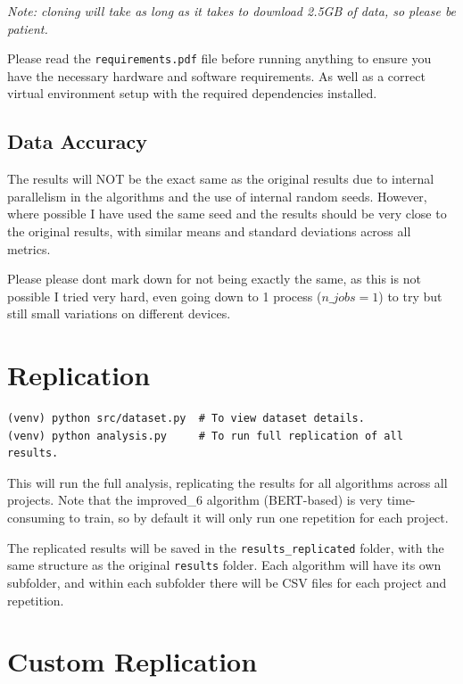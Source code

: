 \documentclass{article}
\begin{document}
\textit{Note: cloning will take as long as it takes to download 2.5GB of data, so please be patient.}

Please read the \texttt{requirements.pdf} file before running anything to ensure you have the necessary hardware and software requirements. As well as a correct virtual environment setup with the required dependencies installed.

\subsection*{Data Accuracy}
The results will NOT be the exact same as the original results due to internal parallelism in the algorithms and the use of internal random seeds.
However, where possible I have used the same seed and the results should be very close to the original results, with similar means and standard deviations across all metrics.

Please please dont mark down for not being exactly the same, as this is not possible I tried very hard,
even going down to 1 process ($n\_jobs=1$) to try but still small variations on different devices.

\vspace{10px}

\section*{Replication}

\begin{verbatim}
(venv) python src/dataset.py  # To view dataset details.
(venv) python analysis.py     # To run full replication of all results.
\end{verbatim}

This will run the full analysis, replicating the results for all algorithms across all projects. Note that the improved\_6 algorithm (BERT-based) is very time-consuming to train, so by default it will only run one repetition for each project.

The replicated results will be saved in the \texttt{results\_replicated} folder, with the same structure as the original \texttt{results} folder. Each algorithm will have its own subfolder, and within each subfolder there will be CSV files for each project and repetition.

\section*{Custom Replication}
\end{document}
